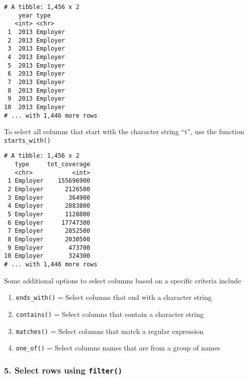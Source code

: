 \documentclass[]{article}
\newenvironment{Shaded}{\begin{snugshade}}{\end{snugshade}}
\newcommand{\KeywordTok}[1]{\textcolor[rgb]{0.13,0.29,0.53}{\textbf{#1}}}
\newcommand{\NormalTok}[1]{#1}
\newcommand{\OperatorTok}[1]{\textcolor[rgb]{0.81,0.36,0.00}{\textbf{#1}}}
\newcommand{\StringTok}[1]{\textcolor[rgb]{0.31,0.60,0.02}{#1}}
\providecommand{\tightlist}{%
  \setlength{\itemsep}{0pt}\setlength{\parskip}{0pt}}
\begin{document}
\begin{verbatim}
# A tibble: 1,456 x 2
    year type    
   <int> <chr>   
 1  2013 Employer
 2  2013 Employer
 3  2013 Employer
 4  2013 Employer
 5  2013 Employer
 6  2013 Employer
 7  2013 Employer
 8  2013 Employer
 9  2013 Employer
10  2013 Employer
# ... with 1,446 more rows
\end{verbatim}

To select all columns that start with the character string ``t'', use
the function \texttt{starts\_with()}

\begin{Shaded}
\end{Shaded}

\begin{verbatim}
# A tibble: 1,456 x 2
   type     tot_coverage
   <chr>           <int>
 1 Employer    155696900
 2 Employer      2126500
 3 Employer       364900
 4 Employer      2883800
 5 Employer      1128800
 6 Employer     17747300
 7 Employer      2852500
 8 Employer      2030500
 9 Employer       473700
10 Employer       324300
# ... with 1,446 more rows
\end{verbatim}

Some additional options to select columns based on a specific criteria
include

\begin{enumerate}
\def\labelenumi{\arabic{enumi}.}
\tightlist
\item
  \texttt{ends\_with()} = Select columns that end with a character
  string
\item
  \texttt{contains()} = Select columns that contain a character string
\item
  \texttt{matches()} = Select columns that match a regular expression
\item
  \texttt{one\_of()} = Select columns names that are from a group of
  names
\end{enumerate}

\hypertarget{select-rows-using-filter}{%
\subsubsection{\texorpdfstring{5. Select rows using
\texttt{filter()}}{5. Select rows using filter()}}\label{select-rows-using-filter}}
\end{document}
